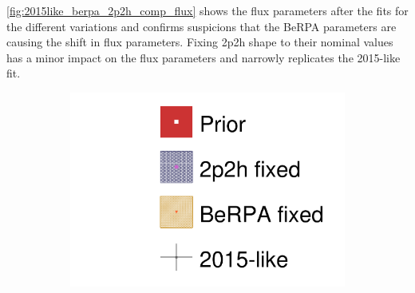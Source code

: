 \autoref{fig:2015like_berpa_2p2h_comp_flux} shows the flux parameters after the fits for the different variations and confirms suspicions that the BeRPA parameters are causing the shift in flux parameters. Fixing 2p2h shape to their nominal values has a minor impact on the flux parameters and narrowly replicates the 2015-like fit.
\begin{figure}[h]
	\begin{subfigure}[t]{0.1\textwidth}
		\includegraphics[width=\textwidth, trim={0mm 0mm 0mm 0mm}, clip,page=1]{figures/mach3/data/alt/2017b_NewData_NewDet_hpc_2p2hshapeFix_0_2017b_NewData_NewDet_hpc_BeRPAfix_0_2017b_NewData_NewDet_hpc_2015like_0.pdf}
	\end{subfigure}


\end{figure}
